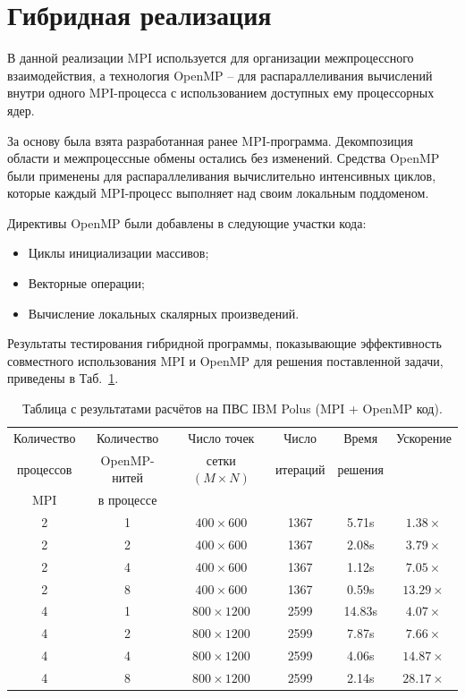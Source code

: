 \documentclass[12pt,a4paper]{article}
\begin{document}
    \section{Гибридная реализация}

    В данной реализации MPI используется для организации межпроцессного взаимодействия, а технология OpenMP -- для распараллеливания вычислений внутри одного MPI-процесса с использованием доступных ему процессорных ядер.

    За основу была взята разработанная ранее MPI-программа. Декомпозиция области и межпроцессные обмены остались без изменений. Средства OpenMP были применены для распараллеливания вычислительно интенсивных циклов, которые каждый MPI-процесс выполняет над своим локальным поддоменом.

    Директивы OpenMP были добавлены в следующие участки кода:

    \begin{itemize}
        \item Циклы инициализации массивов;
        \item Векторные операции;
        \item Вычисление локальных скалярных произведений.
    \end{itemize}

    Результаты тестирования гибридной программы, показывающие эффективность совместного использования MPI и OpenMP для решения поставленной задачи, приведены в Таб.~\ref{tab:mpi_openmp}.

    \begin{table}[h!]
        \centering
        \begin{tabular}{c|c|c|c|c|c}
            \hline
            Количество & Количество & Число точек & Число & Время & Ускорение \\
            процессов & OpenMP-нитей & сетки $ (M \times N) $ & итераций & решения &  \\
            MPI & в процессе & & & &  \\ \hline
            2 & 1 & $400 \times 600$ & 1367 & 5.71s & $1.38\times$ \\
            2 & 2 & $400 \times 600$ & 1367 & 2.08s & $3.79\times$ \\
            2 & 4 & $400 \times 600$ & 1367 & 1.12s & $7.05\times$ \\
            2 & 8 & $400 \times 600$ & 1367 & 0.59s & $13.29\times$ \\ \hline
            4 & 1 & $800 \times 1200$ & 2599 & 14.83s & $4.07\times$ \\
            4 & 2 & $800 \times 1200$ & 2599 & 7.87s & $7.66\times$ \\
            4 & 4 & $800 \times 1200$ & 2599 & 4.06s & $14.87\times$ \\
            4 & 8 & $800 \times 1200$ & 2599 & 2.14s & $28.17\times$ \\

        \end{tabular}
        \caption{Таблица с результатами расчётов на ПВС IBM Polus (MPI + OpenMP код).}
        \label{tab:mpi_openmp}
    \end{table}
\end{document}
